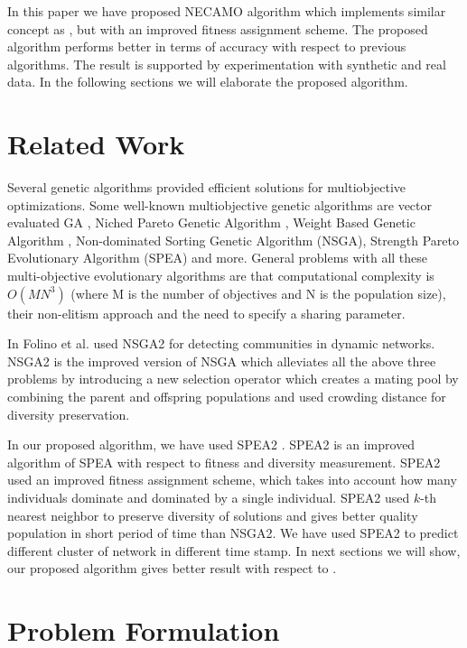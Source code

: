 \documentclass[12pt]{arsubmit}
\begin{document}
In this paper we have proposed NECAMO algorithm which implements similar concept as \cite{spea2}, but with an improved fitness assignment scheme. The proposed algorithm performs better in terms of accuracy with respect to previous algorithms. The result is supported by experimentation with synthetic and real data. In the following sections we will elaborate the proposed algorithm.

\section{Related Work}

Several genetic algorithms provided efficient solutions for multiobjective optimizations. Some well-known multiobjective genetic algorithms are vector evaluated GA \cite{vega}, Niched Pareto Genetic Algorithm \cite{npga}, Weight Based Genetic Algorithm \cite{wbga}, Non-dominated Sorting Genetic Algorithm (NSGA)\cite{nsga}, Strength Pareto Evolutionary Algorithm (SPEA) \cite{spea} and more. General problems with all these multi-objective evolutionary algorithms are that computational complexity is $O(MN^3)$ (where M is the number of objectives and N is the population size), their non-elitism approach and the need to specify a sharing parameter.

In Folino et al. \cite{dynmoga} used NSGA2 \cite{nsga2} for detecting communities in dynamic networks. NSGA2 is the improved version of NSGA \cite{nsga} which alleviates all the above three problems by introducing a new selection operator which creates a mating pool by combining the parent and offspring populations and used crowding distance for diversity preservation.
 
In our proposed algorithm, we have used SPEA2 \cite{spea2}. SPEA2 is an improved algorithm of SPEA with respect to fitness and diversity measurement. SPEA2 used an improved fitness assignment scheme, which takes into account how many individuals dominate and dominated by a single individual. SPEA2 used  $k$-th nearest neighbor to preserve diversity of solutions and gives better quality population in short period of time than NSGA2. We have used SPEA2 to predict different cluster of network in different time stamp. In next sections we will show, our proposed algorithm gives better result with respect to \cite{dynmoga}.


\section{Problem Formulation}
\end{document}
